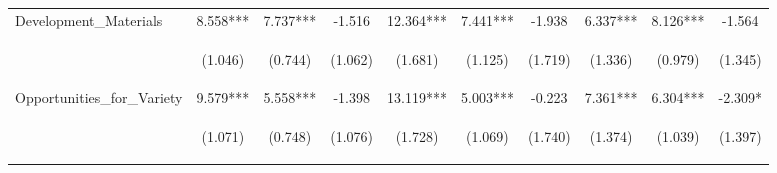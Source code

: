 \begin{tabular}{lccccccccc}
\noalign{\smallskip}Development_Materials & 8.558*** & 7.737*** & -1.516 & 12.364*** & 7.441*** & -1.938 & 6.337*** & 8.126*** & -1.564\\
 & \begin{footnotesize}(1.046)\end{footnotesize} & \begin{footnotesize}(0.744)\end{footnotesize} & \begin{footnotesize}(1.062)\end{footnotesize} & \begin{footnotesize}(1.681)\end{footnotesize} & \begin{footnotesize}(1.125)\end{footnotesize} & \begin{footnotesize}(1.719)\end{footnotesize} & \begin{footnotesize}(1.336)\end{footnotesize} & \begin{footnotesize}(0.979)\end{footnotesize} & \begin{footnotesize}(1.345)\end{footnotesize}\\
\noalign{\smallskip}Opportunities_for_Variety & 9.579*** & 5.558*** & -1.398 & 13.119*** & 5.003*** & -0.223 & 7.361*** & 6.304*** & -2.309*\\
 & \begin{footnotesize}(1.071)\end{footnotesize} & \begin{footnotesize}(0.748)\end{footnotesize} & \begin{footnotesize}(1.076)\end{footnotesize} & \begin{footnotesize}(1.728)\end{footnotesize} & \begin{footnotesize}(1.069)\end{footnotesize} & \begin{footnotesize}(1.740)\end{footnotesize} & \begin{footnotesize}(1.374)\end{footnotesize} & \begin{footnotesize}(1.039)\end{footnotesize} & \begin{footnotesize}(1.397)\end{footnotesize}\\

\end{tabular}
